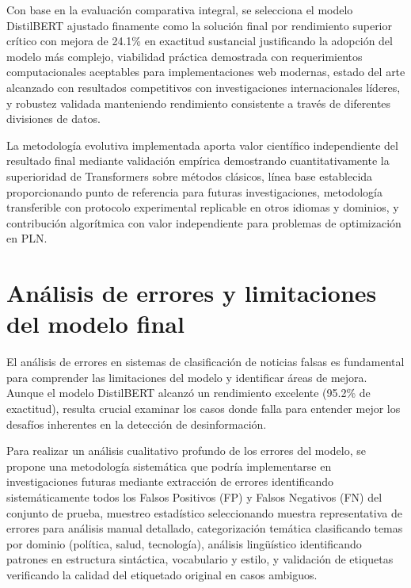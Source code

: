 Con base en la evaluación comparativa integral, se selecciona el modelo DistilBERT ajustado finamente como la solución final por rendimiento superior crítico con mejora de 24.1\% en exactitud sustancial justificando la adopción del modelo más complejo, viabilidad práctica demostrada con requerimientos computacionales aceptables para implementaciones web modernas, estado del arte alcanzado con resultados competitivos con investigaciones internacionales líderes, y robustez validada manteniendo rendimiento consistente a través de diferentes divisiones de datos.

La metodología evolutiva implementada aporta valor científico independiente del resultado final mediante validación empírica demostrando cuantitativamente la superioridad de Transformers sobre métodos clásicos, línea base establecida proporcionando punto de referencia para futuras investigaciones, metodología transferible con protocolo experimental replicable en otros idiomas y dominios, y contribución algorítmica con valor independiente para problemas de optimización en PLN.

\section{Análisis de errores y limitaciones del modelo final}
\label{sec:analisis_errores_limitaciones}

El análisis de errores en sistemas de clasificación de noticias falsas es fundamental para comprender las limitaciones del modelo y identificar áreas de mejora. Aunque el modelo DistilBERT alcanzó un rendimiento excelente (95.2\% de exactitud), resulta crucial examinar los casos donde falla para entender mejor los desafíos inherentes en la detección de desinformación.

Para realizar un análisis cualitativo profundo de los errores del modelo, se propone una metodología sistemática que podría implementarse en investigaciones futuras mediante extracción de errores identificando sistemáticamente todos los Falsos Positivos (FP) y Falsos Negativos (FN) del conjunto de prueba, muestreo estadístico seleccionando muestra representativa de errores para análisis manual detallado, categorización temática clasificando temas por dominio (política, salud, tecnología), análisis lingüístico identificando patrones en estructura sintáctica, vocabulario y estilo, y validación de etiquetas verificando la calidad del etiquetado original en casos ambiguos.

